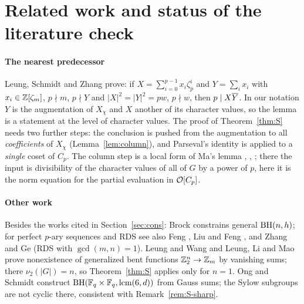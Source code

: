\section{Related work and status of the literature check}\label{sec:prior}

\paragraph{The nearest predecessor}
Leung, Schmidt and Zhang \cite[Lemma~3.11]{LeungSchmidtZhang2023} prove:
if $X=\sum_{i=0}^{p-1}x_i\zeta_p^i$ and $Y=\sum_ix_i$ with
$x_i\in\mathbb{Z}[\zeta_m]$, $p\nmid m$, $p\nmid Y$ and $|X|^2=|Y|^2=pw$,
$p\nmid w$, then $p\mid X\overline{Y}$. In our notation $Y$ is the
augmentation of $X_\chi$ and $X$ another of its character values, so the
lemma is a statement at the level of character values. The proof of
Theorem~\ref{thm:S} needs two further steps: the conclusion is pushed
from the augmentation to all \emph{coefficients} of $X_\chi$
(Lemma~\ref{lem:column}), and Parseval's identity is applied to a
\emph{single} coset of $C_p$. The column step is a local form of Ma's
lemma \cite{Ma1985}, \cite[Lemma~1.5.1]{Pott1995},
\cite[Result~2.4]{DoDuc2019}; there the input is divisibility of the
character values of all of $G$ by a power of $p$, here it is the norm
equation for the partial evaluation in $\mathcal{O}[C_p]$.

\paragraph{Other work}
Besides the works cited in Section~\ref{sec:cons}: Brock
\cite{Brock1988} constrains general $\operatorname{BH}(n,h)$; for perfect $p$-ary
sequences and RDS see also Feng \cite{Feng2009}, Liu and Feng
\cite{LiuFeng2015}, and Zhang and Ge \cite{ZhangGe2018} (RDS with
$\gcd(m,n)=1$). Leung and Wang \cite{LeungWang2020} and Leung, Li and Mao
\cite{LeungLiMao2023} prove nonexistence of generalized bent functions
$\mathbb{Z}_2^n\to\mathbb{Z}_m$ by vanishing sums; there $\nu_2(|G|)=n$, so
Theorem~\ref{thm:S} applies only for $n=1$. Ong and Schmidt
\cite{OngSchmidt2026} construct $\operatorname{BH}(\mathbb{F}_q\times\mathbb{F}_q,\operatorname{lcm}
(6,d))$ from Gauss sums; the Sylow subgroups are not cyclic there,
consistent with Remark~\ref{rem:S-sharp}.

